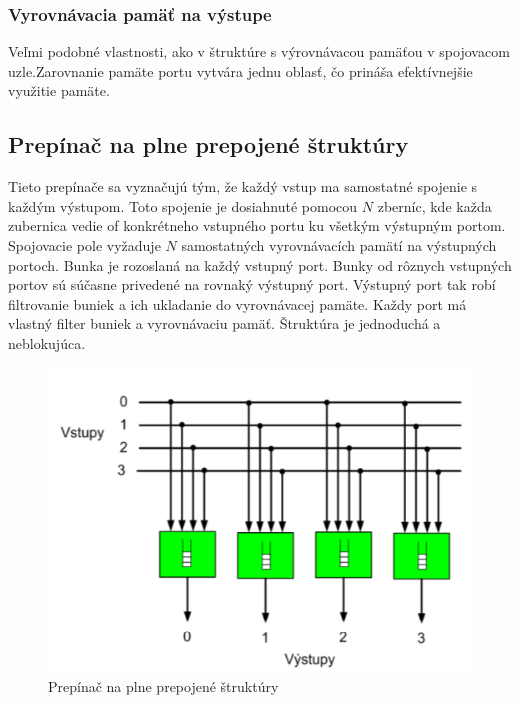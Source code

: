 \subsubsection{Vyrovnávacia pamäť na výstupe}
Veľmi podobné vlastnosti, ako v štruktúre s výrovnávacou pamäťou v spojovacom uzle.Zarovnanie pamäte portu vytvára jednu oblasť, čo prináša efektívnejšie využitie pamäte.


\subsection{Prepínač na plne prepojené štruktúry}
Tieto prepínače sa vyznačujú tým, že každý vstup ma samostatné spojenie s každým výstupom. Toto spojenie je dosiahnuté pomocou $N$ zberníc, kde každa zubernica vedie of konkrétneho vstupného portu ku všetkým výstupným portom. Spojovacie pole vyžaduje $N$ samostatných vyrovnávacích pamätí na výstupných portoch. Bunka je rozoslaná na každý vstupný port. Bunky od rôznych vstupných portov sú súčasne privedené na rovnaký výstupný port. Výstupný port tak robí filtrovanie buniek a ich ukladanie do vyrovnávacej pamäte. Každy port má vlastný filter buniek a vyrovnávaciu pamäť. Štruktúra je jednoduchá a neblokujúca.

\begin{figure}[ht]
\centering
  \begin{center}
    \includegraphics[scale=0.8]{BPC-HWS/images/plne_prep.png}
  \end{center}
  \caption[Prepínač na plne prepojené štruktúry]{Prepínač na plne prepojené štruktúry}
\end{figure}

